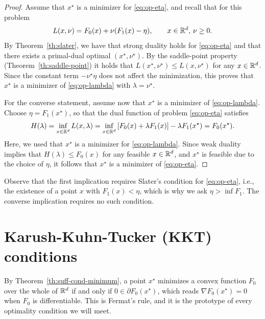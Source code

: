      \begin{proof}
         Assume that $x^\star$ is a minimizer for \eqref{eq:op-eta}, and recall that for this problem
         \begin{equation}
             L(x,\nu) = F_0(x) +\nu (F_1(x)-\eta), \qquad x\in \mathbb{R}^d,\, \nu\ge 0.
         \end{equation}
         By Theorem~\ref{th:slater}, we have that strong duality holds for \eqref{eq:op-eta} and that there exists a primal-dual optimal $(x^\star,\nu^\star)$. By the saddle-point property (Theorem~\ref{th:saddle-point}) it holds that $L(x^\star, \nu^\star)\le L(x, \nu^\star)$ for any $x \in\mathbb{R}^d$. Since the constant term $-\nu^\star\eta$ does not affect the minimization, this proves that $x^\star$ is a minimizer of \eqref{eq:op-lambda} with $\lambda=\nu^\star$.
 
         For the converse statement, assume now that $x^\star$ is a minimizer of \eqref{eq:op-lambda}.
         Choose $\eta = F_1(x^\star)$, so that the dual function of problem \eqref{eq:op-eta} satisfies
         \begin{equation}
             H(\lambda) = \inf_{x\in \mathbb{R}^d} L(x, \lambda) = \inf_{x\in \mathbb{R}^d} \left[ F_0(x) +\lambda F_1(x) \right] - \lambda F_1(x^\star)
             = F_0(x^\star).
         \end{equation}
         Here, we used that $x^\star$ is a minimizer for \eqref{eq:op-lambda}.
         Since weak duality implies that $H(\lambda)\le F_0(x)$ for any feasible $x\in \mathbb{R}^d$, and $x^\star$ is feasible due to the choice of $\eta$, it follows that $x^\star$ is a minimizer of \eqref{eq:op-eta}.
     \end{proof}
 
     \begin{remark}
         Observe that the first implication requires Slater's condition for \eqref{eq:op-eta}, i.e., the existence of a point $x$ with $F_1(x)<\eta$, which is why we ask $\eta>\inf F_1$. The converse implication requires no such condition.
     \end{remark}
 
     \section{Karush-Kuhn-Tucker (KKT) conditions}
     \label{sec:kkt}

     By Theorem~\ref{th:suff-cond-minimum}, a point $x^\star$ minimizes a convex function $F_0$ over the whole of $\mathbb{R}^d$ if and only if $0\in \partial F_0(x^\star)$, which reads $\nabla F_0(x^\star)=0$ when $F_0$ is differentiable. This is Fermat's rule, and it is the prototype of every optimality condition we will meet.

